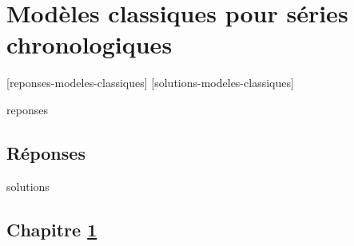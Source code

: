 \chapter{Modèles classiques pour séries chronologiques}
\label{chap:modeles-classiques}

[reponses-modeles-classiques]
[solutions-modeles-classiques]

\begin{Filesave}{reponses}
\bigskip
\section*{Réponses}

\end{Filesave}

\begin{Filesave}{solutions}
\section*{Chapitre \ref{chap:modeles-classiques}}

\end{Filesave}


